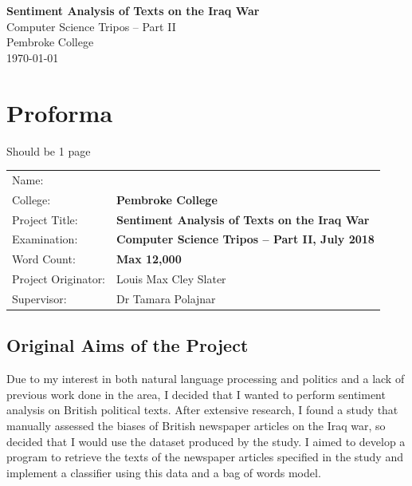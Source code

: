 \documentclass[12pt,a4paper,twoside,openright]{report}
\begin{document}





\pagestyle{empty}


\vspace*{60mm}
\begin{center}
\Huge
\textbf{Sentiment Analysis of Texts on the Iraq War} \\[5mm]
Computer Science Tripos -- Part II \\[5mm]
Pembroke College \\[5mm]
\today  %
\end{center}


\pagestyle{plain}

\chapter*{Proforma}
Should be 1 page

{\large
\begin{tabular}{ll}
Name:               & \bf                        \\
College:            & \bf Pembroke College                     \\
Project Title:      & \bf Sentiment Analysis of Texts on the Iraq War \\
Examination:        & \bf Computer Science Tripos -- Part II, July 2018  \\
Word Count:         & \bf Max 12,000  \\
Project Originator: & Louis Max Cley Slater                    \\
Supervisor:         & Dr Tamara Polajnar                    \\ 
\end{tabular}
}


\section*{Original Aims of the Project}

Due to my interest in both natural language processing and politics and a lack of previous work done in the area, I decided that I wanted to perform sentiment analysis on British political texts. After extensive research, I found a study \cite{iraq_media_study} that manually assessed the biases of British newspaper articles on the Iraq war, so decided that I would use the dataset produced by the study. I aimed to develop a program to retrieve the texts of the newspaper articles specified in the study \cite{iraq_media_study} and implement a classifier using this data and a bag of words model.
\end{document}
